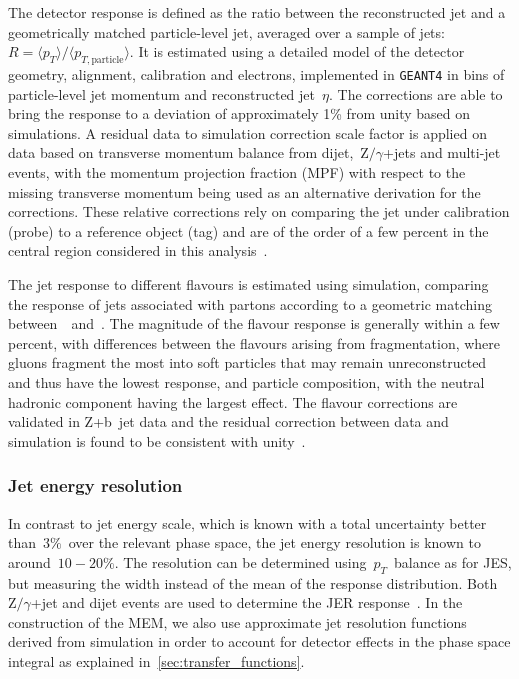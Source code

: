 The detector response is defined as the ratio between the reconstructed jet and a geometrically matched particle-level jet, averaged over a sample of jets:~$R = \langle p_T \rangle / \langle p_{T,\mathrm{particle}} \rangle$. It is estimated using a detailed model of the detector geometry, alignment, calibration and electrons, implemented in \texttt{GEANT4} in bins of particle-level jet momentum and reconstructed jet~$\eta$. The corrections are able to bring the response to a deviation of approximately 1\% from unity based on simulations. A residual data to simulation correction scale factor is applied on data based on transverse momentum balance from dijet,~$\mathrm{Z}/\gamma$+jets and multi-jet events, with the momentum projection fraction (MPF) with respect to the missing transverse momentum being used as an alternative derivation for the corrections. These relative corrections rely on comparing the jet under calibration (probe) to a reference object (tag) and are of the order of a few percent in the central region considered in this analysis~\cite{Chatrchyan:2011ds,cms_jec_2017}.

The jet response to different flavours is estimated using simulation, comparing the response of jets associated with partons according to a geometric matching between~\pythia~and~\herwig. The magnitude of the flavour response is generally within a few percent, with differences between the flavours arising from fragmentation, where gluons fragment the most into soft particles that may remain unreconstructed and thus have the lowest response, and particle composition, with the neutral hadronic component having the largest effect. The flavour corrections are validated in Z+b~jet data and the residual correction between data and simulation is found to be consistent with unity~\cite{Chatrchyan:2011ds}.

\subsubsection{Jet energy resolution}
In contrast to jet energy scale, which is known with a total uncertainty better than~$3\%$~over the relevant phase space, the jet energy resolution is known to around~$10-20\%$. The resolution can be determined using~$p_T$~balance as for JES, but measuring the width instead of the mean of the response distribution. Both~$\mathrm{Z}/\gamma$+jet and dijet events are used to determine the JER response~\cite{Chatrchyan:2011ds}. In the construction of the MEM, we also use approximate jet resolution functions derived from simulation in order to account for detector effects in the phase space integral as explained in~\cref{sec:transfer_functions}.

